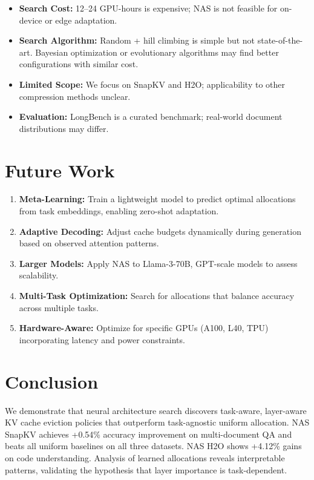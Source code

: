 \documentclass[11pt,a4paper]{article}
\begin{document}
\begin{itemize}
    \item \textbf{Search Cost:} 12–24 GPU-hours is expensive; NAS is not feasible for on-device or edge adaptation.
    \item \textbf{Search Algorithm:} Random + hill climbing is simple but not state-of-the-art. Bayesian optimization or evolutionary algorithms may find better configurations with similar cost.
    \item \textbf{Limited Scope:} We focus on SnapKV and H2O; applicability to other compression methods unclear.
    \item \textbf{Evaluation:} LongBench is a curated benchmark; real-world document distributions may differ.
\end{itemize}

\section{Future Work}

\begin{enumerate}
    \item \textbf{Meta-Learning:} Train a lightweight model to predict optimal allocations from task embeddings, enabling zero-shot adaptation.
    \item \textbf{Adaptive Decoding:} Adjust cache budgets dynamically during generation based on observed attention patterns.
    \item \textbf{Larger Models:} Apply NAS to Llama-3-70B, GPT-scale models to assess scalability.
    \item \textbf{Multi-Task Optimization:} Search for allocations that balance accuracy across multiple tasks.
    \item \textbf{Hardware-Aware:} Optimize for specific GPUs (A100, L40, TPU) incorporating latency and power constraints.
\end{enumerate}

\section{Conclusion}

We demonstrate that neural architecture search discovers task-aware, layer-aware KV cache eviction policies that outperform task-agnostic uniform allocation. NAS SnapKV achieves +0.54\% accuracy improvement on multi-document QA and beats all uniform baselines on all three datasets. NAS H2O shows +4.12\% gains on code understanding. Analysis of learned allocations reveals interpretable patterns, validating the hypothesis that layer importance is task-dependent.
\end{document}
